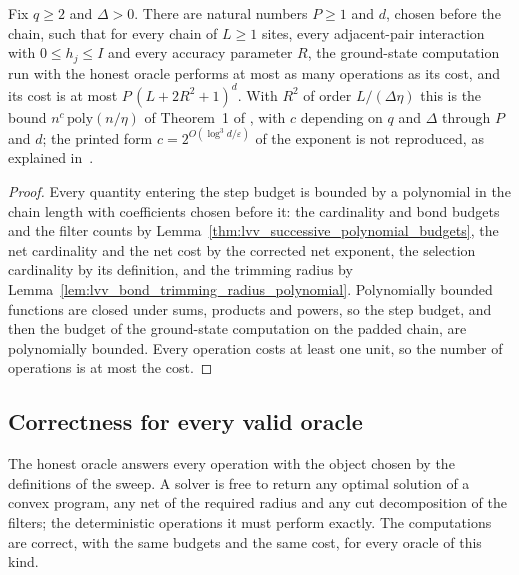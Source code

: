 \begin{theorem}
    \label{thm:lvv_polynomial_running_time}
    \leanok
    Fix $q\ge2$ and $\Delta>0$. There are natural numbers $P\ge1$ and $d$,
    chosen before the chain, such that for every chain of $L\ge1$ sites, every
    adjacent-pair interaction with $0\le h_j\le I$ and every accuracy parameter
    $R$, the ground-state computation run with the honest oracle performs at
    most as many operations as its cost, and its cost is at most
    $P\,(L+2R^2+1)^d$. With $R^2$ of order $L/(\Delta\eta)$ this is the bound
    $n^{c}\,\mathrm{poly}(n/\eta)$ of Theorem~1 of
    \cite{Landau2015Polynomial}, with $c$ depending on $q$ and $\Delta$ through
    $P$ and $d$; the printed form $c=2^{O(\log^3 d/\varepsilon)}$ of the exponent
    is not reproduced, as explained in~\cite{gap:lvv13_cost_model}.
\end{theorem}
\begin{proof}
    \leanok
    Every quantity entering the step budget is bounded by a polynomial in the
    chain length with coefficients chosen before it: the cardinality and bond
    budgets and the filter counts by
    Lemma~\ref{thm:lvv_successive_polynomial_budgets}, the net cardinality and
    the net cost by the corrected net exponent, the selection cardinality by its
    definition, and the trimming radius by
    Lemma~\ref{lem:lvv_bond_trimming_radius_polynomial}. Polynomially bounded
    functions are closed under sums, products and powers, so the step budget,
    and then the budget of the ground-state computation on the padded chain, are
    polynomially bounded. Every operation costs at least one unit, so the
    number of operations is at most the cost.
\end{proof}

\subsection{Correctness for every valid oracle}
\label{sec:lvv_valid_oracle}

The honest oracle answers every operation with the object chosen by the
definitions of the sweep. A solver is free to return any optimal solution of a
convex program, any net of the required radius and any cut decomposition of
the filters; the deterministic operations it must perform exactly. The
computations are correct, with the same budgets and the same cost, for every
oracle of this kind.

